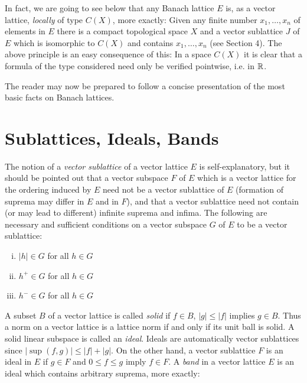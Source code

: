 In fact, we are going to see below that any Banach lattice $ E $ is, as a vector lattice, \emph{locally} of type $ C(X) $, more exactly:
Given any finite number $ x_{1},\ldots,x_{n} $ of elements in $ E $ there is a compact topological space $ X $ and a vector sublattice $ J $ of $ E $ which is isomorphic to $ C(X) $ and contains $ x_{1},\ldots,x_{n} $ (see Section 4).
The above principle is an easy consequence of this:
In a space $ C(X) $ it is clear that a formula of the type considered need only be verified pointwise, i.e. in $ \mathbb{R} $.

The reader may now be prepared to follow a concise presentation of the most basic facts on Banach lattices.

\section{Sublattices, Ideals, Bands}\label{sec:c1-1}

The notion of a \emph{vector sublattice} of a vector lattice $ E $ is self-explanatory, but it should be pointed out that a vector subspace $ F $ of $ E $ which is a vector lattice for the ordering induced by $ E $ need not be a vector sublattice of $ E $ (formation of suprema may differ in $ E $ and in $ F $), and that a vector sublattice need not contain (or may lead to different) infinite suprema and infima.
The following are necessary and sufficient conditions on a vector subspace $ G $ of $ E $ to be a vector sublattice:

\begin{enumerate}[(i)]
\item $ |h| \in G $ for all $ h \in G $
\item $ h^{+} \in G $ for all $ h \in G $
\item $ h^{-} \in G $ for all $ h \in G $
\end{enumerate}

A subset $ B $ of a vector lattice is called \emph{solid} if $ f \in B $, $ |g| \leq |f| $ implies $ g \in B $.
Thus a norm on a vector lattice is a lattice norm if and only if its unit ball is solid.
A solid linear subspace is called an \emph{ideal}.
Ideals are automatically vector sublattices since $ |\sup(f,g)| \leq |f| + |g| $.
On the other hand, a vector sublattice $ F $ is an ideal in $ E $ if $ g \in F $ and $ 0 \leq f \leq g $ imply $ f \in F $.
A \emph{band} in a vector lattice $ E $ is an ideal which contains arbitrary suprema, more exactly: 


